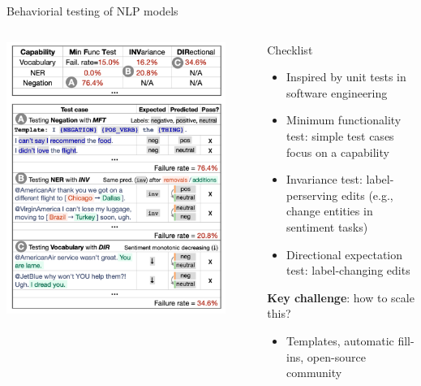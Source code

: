 \documentclass[usenames,dvipsnames,notes,11pt,aspectratio=169,hyperref={colorlinks=true, linkcolor=blue}]{beamer}
\begin{document}
\begin{frame}
    {Behaviorial testing of NLP models}
    \begin{columns}
        \begin{column}{0.41\textwidth}
            \includegraphics[width=0.9\textwidth]{figures/checklist}
        \end{column}
        \begin{column}{0.59\textwidth}
            Checklist 
            \begin{itemize}
                \item Inspired by unit tests in software engineering  
                \item Minimum functionality test: simple test cases focus on a capability
                \item Invariance test: label-perserving edits (e.g., change entities in sentiment tasks)
                \item Directional expectation test: label-changing edits
            \end{itemize}
            \pause
            \textbf{Key challenge}: how to scale this?\\
            \begin{itemize}
                \item Templates, automatic fill-ins, open-source community 
            \end{itemize}
        \end{column}
    \end{columns}
\end{frame}
\end{document}
